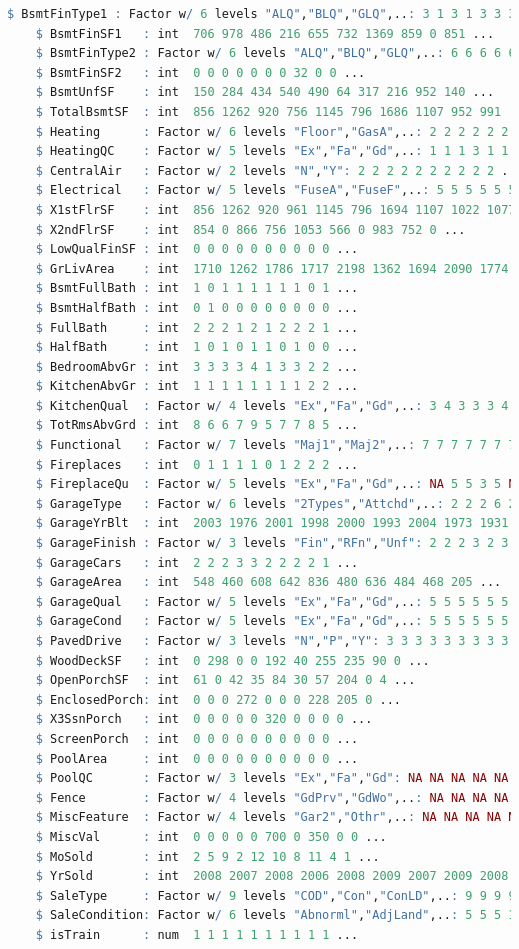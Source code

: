 \documentclass[sigconf]{acmart}
\begin{document}
\begin{lstlisting}[language=R]
	$ BsmtFinType1 : Factor w/ 6 levels "ALQ","BLQ","GLQ",..: 3 1 3 1 3 3 3 1 6 3 ...
	$ BsmtFinSF1   : int  706 978 486 216 655 732 1369 859 0 851 ...
	$ BsmtFinType2 : Factor w/ 6 levels "ALQ","BLQ","GLQ",..: 6 6 6 6 6 6 6 2 6 6 ...
	$ BsmtFinSF2   : int  0 0 0 0 0 0 0 32 0 0 ...
	$ BsmtUnfSF    : int  150 284 434 540 490 64 317 216 952 140 ...
	$ TotalBsmtSF  : int  856 1262 920 756 1145 796 1686 1107 952 991 ...
	$ Heating      : Factor w/ 6 levels "Floor","GasA",..: 2 2 2 2 2 2 2 2 2 2 ...
	$ HeatingQC    : Factor w/ 5 levels "Ex","Fa","Gd",..: 1 1 1 3 1 1 1 1 3 1 ...
	$ CentralAir   : Factor w/ 2 levels "N","Y": 2 2 2 2 2 2 2 2 2 2 ...
	$ Electrical   : Factor w/ 5 levels "FuseA","FuseF",..: 5 5 5 5 5 5 5 5 2 5 ...
	$ X1stFlrSF    : int  856 1262 920 961 1145 796 1694 1107 1022 1077 ...
	$ X2ndFlrSF    : int  854 0 866 756 1053 566 0 983 752 0 ...
	$ LowQualFinSF : int  0 0 0 0 0 0 0 0 0 0 ...
	$ GrLivArea    : int  1710 1262 1786 1717 2198 1362 1694 2090 1774 1077 ...
	$ BsmtFullBath : int  1 0 1 1 1 1 1 1 0 1 ...
	$ BsmtHalfBath : int  0 1 0 0 0 0 0 0 0 0 ...
	$ FullBath     : int  2 2 2 1 2 1 2 2 2 1 ...
	$ HalfBath     : int  1 0 1 0 1 1 0 1 0 0 ...
	$ BedroomAbvGr : int  3 3 3 3 4 1 3 3 2 2 ...
	$ KitchenAbvGr : int  1 1 1 1 1 1 1 1 2 2 ...
	$ KitchenQual  : Factor w/ 4 levels "Ex","Fa","Gd",..: 3 4 3 3 3 4 3 4 4 4 ...
	$ TotRmsAbvGrd : int  8 6 6 7 9 5 7 7 8 5 ...
	$ Functional   : Factor w/ 7 levels "Maj1","Maj2",..: 7 7 7 7 7 7 7 7 3 7 ...
	$ Fireplaces   : int  0 1 1 1 1 0 1 2 2 2 ...
	$ FireplaceQu  : Factor w/ 5 levels "Ex","Fa","Gd",..: NA 5 5 3 5 NA 3 5 5 5 ...
	$ GarageType   : Factor w/ 6 levels "2Types","Attchd",..: 2 2 2 6 2 2 2 2 6 2 ...
	$ GarageYrBlt  : int  2003 1976 2001 1998 2000 1993 2004 1973 1931 1939 ...
	$ GarageFinish : Factor w/ 3 levels "Fin","RFn","Unf": 2 2 2 3 2 3 2 2 3 2 ...
	$ GarageCars   : int  2 2 2 3 3 2 2 2 2 1 ...
	$ GarageArea   : int  548 460 608 642 836 480 636 484 468 205 ...
	$ GarageQual   : Factor w/ 5 levels "Ex","Fa","Gd",..: 5 5 5 5 5 5 5 5 2 3 ...
	$ GarageCond   : Factor w/ 5 levels "Ex","Fa","Gd",..: 5 5 5 5 5 5 5 5 5 5 ...
	$ PavedDrive   : Factor w/ 3 levels "N","P","Y": 3 3 3 3 3 3 3 3 3 3 ...
	$ WoodDeckSF   : int  0 298 0 0 192 40 255 235 90 0 ...
	$ OpenPorchSF  : int  61 0 42 35 84 30 57 204 0 4 ...
	$ EnclosedPorch: int  0 0 0 272 0 0 0 228 205 0 ...
	$ X3SsnPorch   : int  0 0 0 0 0 320 0 0 0 0 ...
	$ ScreenPorch  : int  0 0 0 0 0 0 0 0 0 0 ...
	$ PoolArea     : int  0 0 0 0 0 0 0 0 0 0 ...
	$ PoolQC       : Factor w/ 3 levels "Ex","Fa","Gd": NA NA NA NA NA NA NA NA NA NA ...
	$ Fence        : Factor w/ 4 levels "GdPrv","GdWo",..: NA NA NA NA NA 3 NA NA NA NA ...
	$ MiscFeature  : Factor w/ 4 levels "Gar2","Othr",..: NA NA NA NA NA 3 NA 3 NA NA ...
	$ MiscVal      : int  0 0 0 0 0 700 0 350 0 0 ...
	$ MoSold       : int  2 5 9 2 12 10 8 11 4 1 ...
	$ YrSold       : int  2008 2007 2008 2006 2008 2009 2007 2009 2008 2008 ...
	$ SaleType     : Factor w/ 9 levels "COD","Con","ConLD",..: 9 9 9 9 9 9 9 9 9 9 ...
	$ SaleCondition: Factor w/ 6 levels "Abnorml","AdjLand",..: 5 5 5 1 5 5 5 5 1 5 ...
	$ isTrain      : num  1 1 1 1 1 1 1 1 1 1 ...
	\end{lstlisting}
	
\end{document}

